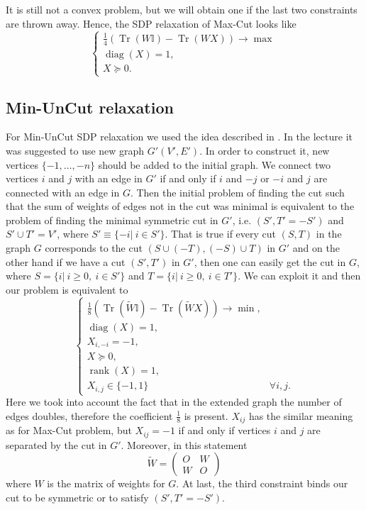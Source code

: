 \documentclass[12pt]{article}
\DeclareMathOperator{\trace}{Tr}
\DeclareMathOperator{\diag}{diag}
\DeclareMathOperator{\rank}{rank}
\begin{document}
It is  still not a convex problem, but we will obtain one if the last two constraints are thrown away. Hence, the SDP relaxation of Max-Cut looks like
\begin{equation}
    \label{maxcut_rel}
    \begin{cases}
        \frac 14 \left(\trace(W \mathbb{I}) - \trace(W X)\right) \longrightarrow \max\\
        \diag(X) = 1,\\
        X \succeq 0.
    \end{cases}
\end{equation}

\subsection{Min-UnCut relaxation}

For Min-UnCut SDP relaxation we used the idea described in \cite{Arora}. In the lecture it was suggested to use new graph $G'(V', E')$. In order to construct it, new vertices $\{-1, \dots, -n \}$ should be added to the initial graph. We connect two vertices $i$ and $j$ with an edge in $G'$ if and only if $i$ and $-j$ or $-i$ and $j$ are connected with an edge in $G$. Then the initial problem of finding the cut such that the sum of weights of edges not in the cut was minimal is equivalent to the problem of finding the minimal symmetric cut in $G'$, i.e. $(S', T' = -S')$ and $S' \cup T' = V'$, where $S' \equiv \{ -i | ~i\in S'\} $. That is true if every cut $(S, T)$ in the graph $G$ corresponds to the cut $(S \cup (-T), (-S) \cup T)$ in $G'$ and on the other hand if we have a cut $(S', T')$ in $G'$, then one can easily get the cut in $G$, where $S = \{i|~ i \geq 0, ~i\in S'\}$ and $T = \{i| ~ i \geq 0, ~i\in T' \}$. We can exploit it and then our problem is equivalent to 
\[
\begin{cases}
    \frac 18 \left(\trace(\tilde W \mathbb{I}) - \trace(\tilde W X)\right) \longrightarrow \min,  &\\
        \diag(X) = 1, &\\
        X_{i, -i} = -1, &\\
        X \succeq 0, &\\
        \rank(X) = 1,  &\\
        X_{i,j} \in \{-1,1\} & \forall i, j.
\end{cases}
\]
Here we took into account the fact that in the extended graph the number of edges doubles, therefore the coefficient $\frac 18$ is present. $X_{ij}$ has the similar meaning as for Max-Cut problem, but $X_{ij} = -1$ if and only if vertices $i$ and $j$ are separated by the cut in $G'$. Moreover, in this statement
\[
\tilde W = \begin{pmatrix} O & W \\ W & O\end{pmatrix}
\]
where $W$ is the matrix of weights for $G$. At last, the third constraint binds our cut to be symmetric or to satisfy $(S', T' = -S')$. 
\end{document}
